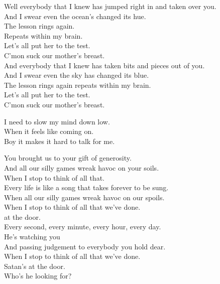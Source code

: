 Well everybody that I knew has jumped right in and taken over you. \\
And I swear even the ocean's changed its hue. \\
The lesson rings again. \\
Repeats within my brain. \\
Let's all put her to the test. \\
C'mon suck our mother's breast. \\

And everybody that I knew has taken bits and pieces out of you. \\
And I swear even the sky has changed its blue. \\
The lesson rings again repeats within my brain. \\
Let's all put her to the test. \\
C'mon suck our mother's breast. \\




I need to slow my mind down low. \\

When it feels like coming on. \\
Boy it makes it hard to talk for me. \\




You brought us to your gift of generosity. \\
And all our silly games wreak havoc on your soils. \\
When I stop to think of all that. \\

Every life is like a song that takes forever to be sung. \\
When all our silly games wreak havoc on our spoils. \\
When I stop to think of all that we've done. \\
 at the door. \\

Every second, every minute, every hour, every day. \\
He's watching you \\
And passing judgement to everybody you hold dear. \\
When I stop to think of all that we've done. \\
Satan's at the door. \\
Who's he looking for? \\

